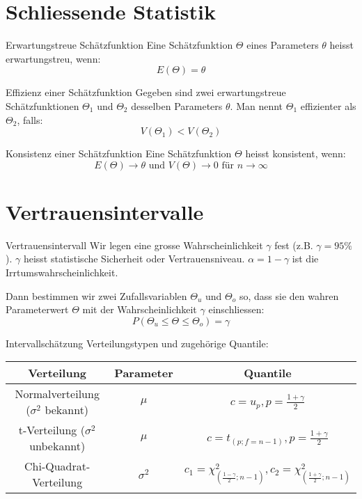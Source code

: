 \section{Schliessende Statistik}
\begin{definition}{Erwartungstreue Schätzfunktion}
Eine Schätzfunktion $\Theta$ eines Parameters $\theta$ heisst erwartungstreu, wenn:
$$
E(\Theta)=\theta
$$
\end{definition}

\begin{definition}{Effizienz einer Schätzfunktion}
Gegeben sind zwei erwartungstreue Schätzfunktionen $\Theta_1$ und $\Theta_2$ desselben Parameters $\theta$. Man nennt $\Theta_1$ effizienter als $\Theta_2$, falls:
$$
V(\Theta_1)<V(\Theta_2)
$$
\end{definition}

\begin{definition}{Konsistenz einer Schätzfunktion}
Eine Schätzfunktion $\Theta$ heisst konsistent, wenn:
$$
E(\Theta) \rightarrow \theta \text{ und } V(\Theta) \rightarrow 0 \text{ für } n \rightarrow \infty
$$
\end{definition}

\section{Vertrauensintervalle}
\begin{definition}{Vertrauensintervall}
Wir legen eine grosse Wahrscheinlichkeit $\gamma$ fest (z.B. $\gamma=95\%$). $\gamma$ heisst statistische Sicherheit oder Vertrauensniveau. $\alpha=1-\gamma$ ist die Irrtumswahrscheinlichkeit.

Dann bestimmen wir zwei Zufallsvariablen $\Theta_u$ und $\Theta_o$ so, dass sie den wahren Parameterwert $\Theta$ mit der Wahrscheinlichkeit $\gamma$ einschliessen:
$$
P(\Theta_u \leq \Theta \leq \Theta_o)=\gamma
$$
\end{definition}

\begin{concept}{Intervallschätzung}
Verteilungstypen und zugehörige Quantile:
\begin{center}
\begin{tabular}{|c|c|c|}
\hline
Verteilung & Parameter & Quantile \\
\hline
Normalverteilung ($\sigma^2$ bekannt) & $\mu$ & $c=u_p, p=\frac{1+\gamma}{2}$ \\
\hline
t-Verteilung ($\sigma^2$ unbekannt) & $\mu$ & $c=t_{(p;f=n-1)}, p=\frac{1+\gamma}{2}$ \\
\hline
Chi-Quadrat-Verteilung & $\sigma^2$ & $c_1=\chi^2_{(\frac{1-\gamma}{2};n-1)}, c_2=\chi^2_{(\frac{1+\gamma}{2};n-1)}$ \\
\hline
\end{tabular}
\end{center}
\end{concept}

